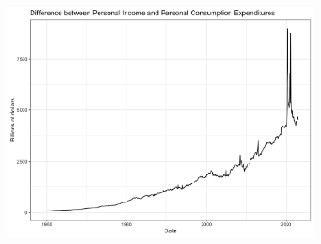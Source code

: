 \documentclass{article}
\begin{document}
\begin{figure}[!t]
\centering
\includegraphics[width=0.8\textwidth]{PS6c_Gallart.png}

\end{figure}
\end{document}
